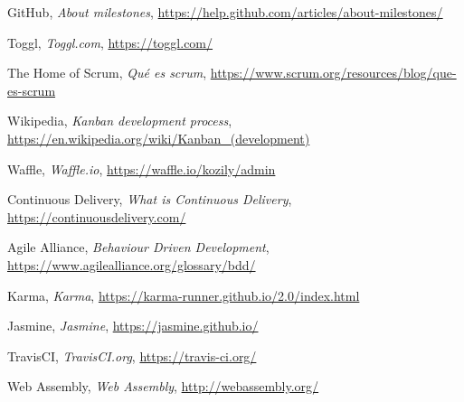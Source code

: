 \documentclass[a4paper,11pt]{article}
\begin{document}
\begin{thebibliography}{9}
GitHub,
\textit{About milestones},
\url{https://help.github.com/articles/about-milestones/}

Toggl,
\textit{Toggl.com},
\url{https://toggl.com/}

The Home of Scrum,
\textit{Qué es scrum},
\url{https://www.scrum.org/resources/blog/que-es-scrum}

Wikipedia,
\textit{Kanban development process},
\url{https://en.wikipedia.org/wiki/Kanban_(development)}

Waffle,
\textit{Waffle.io},
\url{https://waffle.io/kozily/admin}

Continuous Delivery,
\textit{What is Continuous Delivery},
\url{https://continuousdelivery.com/}

Agile Alliance,
\textit{Behaviour Driven Development},
\url{https://www.agilealliance.org/glossary/bdd/}

Karma,
\textit{Karma},
\url{https://karma-runner.github.io/2.0/index.html}

Jasmine,
\textit{Jasmine},
\url{https://jasmine.github.io/}

TravisCI,
\textit{TravisCI.org},
\url{https://travis-ci.org/}

Web Assembly,
\textit{Web Assembly},
\url{http://webassembly.org/}

\end{thebibliography}
\end{document}
